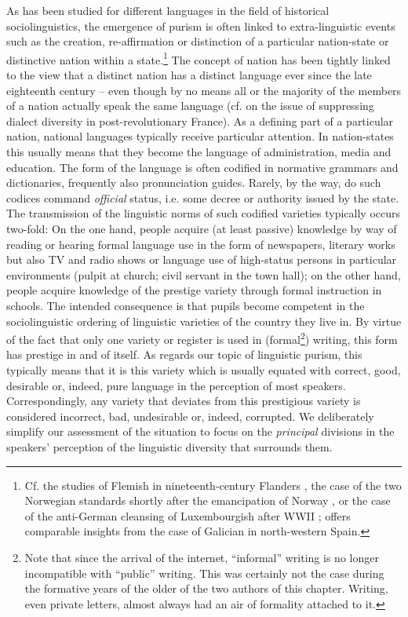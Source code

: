 \documentclass[output=paper]{langsci/langscibook}
\begin{document}
As has been studied for different languages in the field of historical sociolinguistics, the emergence of purism is often linked to extra-linguistic events such as the creation, re-affirmation or distinction of a particular nation-state or distinctive nation within a state.\footnote{Cf. the studies of Flemish in nineteenth-century Flanders \citep{VandenbusscheEtAl2005}, the case of the two Norwegian standards shortly after the emancipation of Norway \citep{Jahr2007}, or the case of the anti-German cleansing of Luxembourgish after WWII \citep{Horner2005}; \citet{DelValle2016} offers comparable insights from the case of Galician in north-western Spain.} The concept of nation has been tightly linked to the view that a distinct nation has a distinct language ever since the late eighteenth century – even though by no means all or the majority of the members of a nation actually speak the same language (cf. \citealt{Weber1977} on the issue of suppressing dialect diversity in post-revolutionary France). As a defining part of a particular nation, national languages typically receive particular attention. In nation-states this usually means that they become the language of administration, media and education. The form of the language is often codified in normative grammars and dictionaries, frequently also pronunciation guides. Rarely, by the way, do such codices command \textit{official} status, i.e. some decree or authority issued by the state. The transmission of the linguistic norms of such codified varieties typically occurs two-fold: On the one hand, people acquire (at least passive) knowledge by way of reading or hearing formal language use in the form of newspapers, literary works but also TV and radio shows or language use of high-status persons in particular environments (pulpit at church; civil servant in the town hall); on the other hand, people acquire knowledge of the prestige variety through formal instruction in schools. The intended consequence is that pupils become competent in the sociolinguistic ordering of linguistic varieties of the country they live in. By virtue of the fact that only one variety or register is used in (formal\footnote{Note that since the arrival of the internet, “informal” writing is no longer incompatible with “public” writing. This was certainly not the case during the formative years of the older of the two authors of this chapter. Writing, even private letters, almost always had an air of formality attached to it.}) writing, this form has prestige in and of itself. As regards our topic of linguistic purism, this typically means that it is this variety which is usually equated with correct, good, desirable or, indeed, pure language in the perception of most speakers. Correspondingly, any variety that deviates from this prestigious variety is considered incorrect, bad, undesirable or, indeed, corrupted. We deliberately simplify our assessment of the situation to focus on the \textit{principal} divisions in the speakers’ perception of the linguistic diversity that surrounds them.
\end{document}
